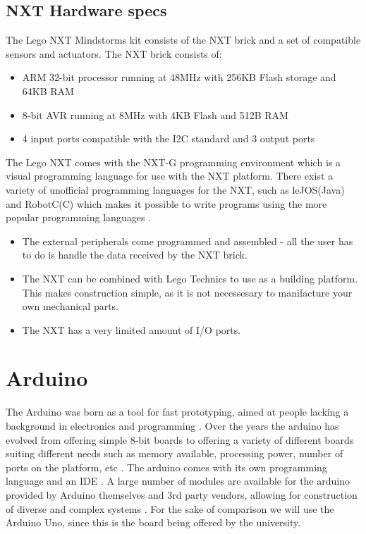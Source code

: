 \subsection{NXT Hardware specs}
The Lego NXT Mindstorms kit consists of the NXT brick and a set of
compatible sensors and actuators. The NXT brick \citep[P.70]{NXTStats} consists
of:

\begin{itemize}
  \item ARM 32-bit processor running at 48MHz with 256KB Flash storage and 64KB RAM
  \item 8-bit AVR running at 8MHz with 4KB Flash and 512B RAM
  \item 4 input ports compatible with the I2C standard and 3 output ports
\end{itemize}

The Lego NXT comes with the NXT-G programming environment which is a visual
programming language for use with the NXT platform. There exist a variety of
unofficial programming languages for the NXT, such as leJOS(Java) and
RobotC(C) which makes it possible to write programs using the more popular programming
languages \citep{NXTProgrammingLanguage}.

\begin{itemize}
  \item The external peripherals come programmed and assembled - all the user
  has to do is handle the data received by the NXT brick.
  \item The NXT can be combined with Lego Technics to use as a building
  platform. This makes construction simple, as it is not necessesary to
  manifacture your own mechanical parts.
  \item The NXT has a very limited amount of I/O ports.
\end{itemize}

\section{Arduino}
The Arduino was born as a tool for fast prototyping, aimed at people lacking a
background in electronics and programming . Over the years the arduino has
evolved from offering simple 8-bit boards to offering a variety of different
boards suiting different needs such as memory available, processing power,
number of ports on the platform, etc . The arduino comes with its
own programming language and an IDE \citep{ArduinoIntro}. A large number of modules are available for
the arduino provided by Arduino themselves and 3rd party vendors, allowing for
construction of diverse and complex systems \citep{ArduinoComponents}.
For the sake of comparison we will use the Arduino Uno, since this is the board being offered by
the university.

